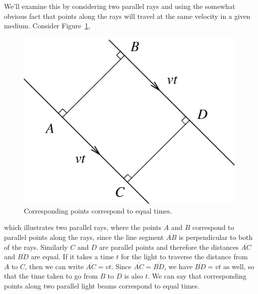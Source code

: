We'll examine this by considering two parallel rays and using the somewhat 
obvious fact that points along the rays will travel at the same velocity in a 
given medium.  Consider Figure~\ref{fig:opt:parallelpts},
\begin{figure}[htb]
\centering 
\epsfxsize=6cm \includegraphics[scale=0.6]{8_refraction/parallelpts.eps}
\caption{Corresponding points correspond to equal times.}
\label{fig:opt:parallelpts}
\end{figure}
which illustrates two parallel rays, where the points $A$ and $B$ correspond
to parallel points along the rays, since the line segment $\overline{AB}$ is 
perpendicular to both of the rays. Similarly $C$ and $D$ are parallel points 
and therefore the distances $\overline{AC}$ and $\overline{BD}$ are equal.
If it takes a time $t$ for the light to traverse the distance from $A$ to $C$, 
then we can write $\overline{AC}=vt$. Since $\overline{AC}=\overline{BD}$, we 
have $\overline{BD}=vt$ as well, so that the time taken to go from $B$ to $D$
is also $t$. We can say that corresponding points along two parallel light 
beams correspond to equal times.

